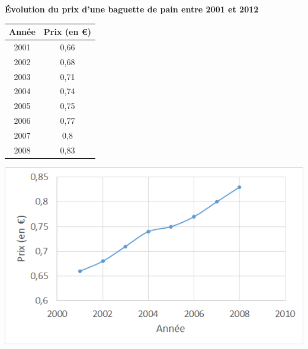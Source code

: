 \begin{myex}
	
	\textbf{\'Evolution du prix d'une baguette de pain entre 2001 et 2012}
	
	\begin{multicols*}{2}
	
		\begin{small}
			
		
		\begin{center}
			\begin{tabular}{|@{\ }c@{\ }|@{\ }c@{\ }|}
				\hline
				Année & Prix (en €) \\ \hline
				2001 & 0,66  \\ \hline
				2002 & 0,68  \\ \hline
				2003 & 0,71  \\ \hline
				2004 & 0,74  \\ \hline
				2005 & 0,75  \\ \hline
				2006 & 0,77  \\ \hline
				2007 & 0,8  \\ \hline
				2008 & 0,83  \\ \hline
			\end{tabular}
		\end{center}
		
		\end{small}	
		\includegraphics[scale=0.75]{img/cart}
	\end{multicols*}
	
\end{myex}